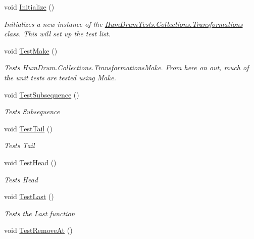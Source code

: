 \begin{DoxyCompactItemize}
\item 
void \hyperlink{classHumDrumTests_1_1Collections_1_1Transformations_a0ccc42d50ca0b80a30edd5e6d984d899}{Initialize} ()
\begin{DoxyCompactList}\small\item\em Initializes a new instance of the \hyperlink{classHumDrumTests_1_1Collections_1_1Transformations}{Hum\+Drum\+Tests.\+Collections.\+Transformations} class. This will set up the test list. \end{DoxyCompactList}\item 
void \hyperlink{classHumDrumTests_1_1Collections_1_1Transformations_a3e45ad40d9f0f44fa2b83770876039f4}{Test\+Make} ()
\begin{DoxyCompactList}\small\item\em Tests Hum\+Drum.\+Collections.\+Transformations\+Make. From here on out, much of the unit tests are tested using Make. \end{DoxyCompactList}\item 
void \hyperlink{classHumDrumTests_1_1Collections_1_1Transformations_ad8e4571f4057e5ed46837da6938ddb39}{Test\+Subsequence} ()
\begin{DoxyCompactList}\small\item\em Tests Subsequence \end{DoxyCompactList}\item 
void \hyperlink{classHumDrumTests_1_1Collections_1_1Transformations_ac61e146ba0a88f0ad9df6f48dcf49f9b}{Test\+Tail} ()
\begin{DoxyCompactList}\small\item\em Tests Tail \end{DoxyCompactList}\item 
void \hyperlink{classHumDrumTests_1_1Collections_1_1Transformations_a46ed83f05c486eff9b2ccc7e139ced16}{Test\+Head} ()
\begin{DoxyCompactList}\small\item\em Tests Head \end{DoxyCompactList}\item 
void \hyperlink{classHumDrumTests_1_1Collections_1_1Transformations_a7289f6d72f26f3f96585aab00e37c29a}{Test\+Last} ()
\begin{DoxyCompactList}\small\item\em Tests the Last function \end{DoxyCompactList}\item 
void \hyperlink{classHumDrumTests_1_1Collections_1_1Transformations_a14eb6b1101bafcb6a9d23b0ec1b92571}{Test\+Remove\+At} ()

\end{DoxyCompactItemize}
